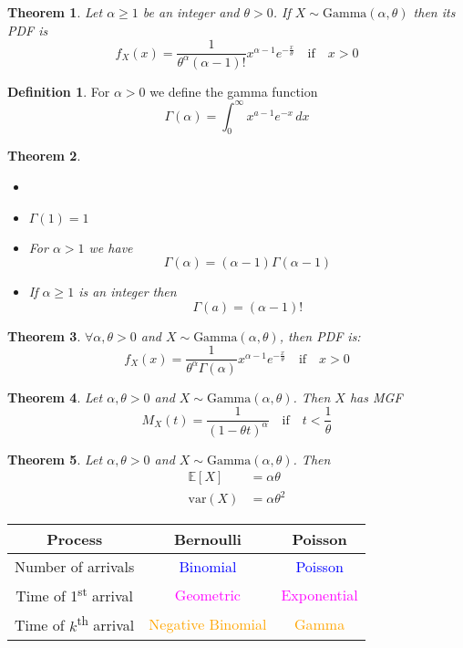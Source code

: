 \documentclass{article}
\newcommand{\E}{\mathbb{E}}
\newcommand{\var}{\text{var}}
\newcommand{\blue}{\textcolor{blue}}
\theoremstyle{plain}
\newtheorem{thm}{Theorem}[section]
\theoremstyle{definition}
\newtheorem{defn}{Definition}[section]
\theoremstyle{remark}
\begin{document}
\begin{thm}
    Let $\alpha\geq 1$ be an integer and $\theta>0$. If $X\sim\text{Gamma}(\alpha,\theta)$ then its PDF is \[f_X(x)=\frac{1}{\theta^\alpha(\alpha-1)!}x^{\alpha-1}e^{-\frac{x}{\theta}} \quad \text{if} \quad x>0\]
\end{thm}

\begin{defn}
    For $\alpha>0$ we define the gamma function \[\Gamma(\alpha)=\int_0^\infty x^{a-1}e^{-x}\,dx\]
\end{defn}

\begin{thm}
    \begin{itemize}
        \item []
        \item $\Gamma(1)=1$
        \item For $\alpha>1$ we have \[\Gamma(\alpha)=(\alpha-1)\Gamma(\alpha-1)\] 
        \item If $\alpha\geq 1$ is an integer then \[\Gamma(a)=(\alpha-1)!\]
    \end{itemize}
\end{thm}

\begin{thm}
    $\forall \alpha, \theta > 0$ and $X\sim\text{Gamma}(\alpha,\theta)$, then PDF is: \[f_X(x)=\frac{1}{\theta^\alpha\Gamma(\alpha)}x^{\alpha-1}e^{-\frac{x}{\theta}} \quad \text{if} \quad x>0\]
\end{thm}

\begin{thm}
    Let $\alpha,\theta>0$ and $X\sim\text{Gamma}(\alpha,\theta)$. Then $X$ has MGF \[M_X(t)=\frac{1}{(1-\theta t)^\alpha} \quad \text{if} \quad t<\frac{1}{\theta}\]
\end{thm}

\begin{thm}
    Let $\alpha,\theta>0$ and $X\sim\text{Gamma}(\alpha,\theta)$. Then
    \begin{align*}
        \E[X]&=\alpha\theta \\
        \var(X)&=\alpha\theta^2
    \end{align*}
\end{thm}

\begingroup
\setlength{\tabcolsep}{8pt}
\renewcommand{\arraystretch}{1.5}
\begin{center}
\begin{tabular}{ c | c c }
    Process & Bernoulli & Poisson \\
    \hline
    Number of arrivals & \blue{Binomial} & \blue{Poisson} \\
    Time of 1\textsuperscript{st} arrival & \textcolor{magenta}{Geometric} & \textcolor{magenta}{Exponential} \\
    Time of $k$\textsuperscript{th} arrival & \textcolor{orange}{Negative Binomial} & \textcolor{orange}{Gamma}
\end{tabular}
\end{center}
\endgroup
\end{document}
